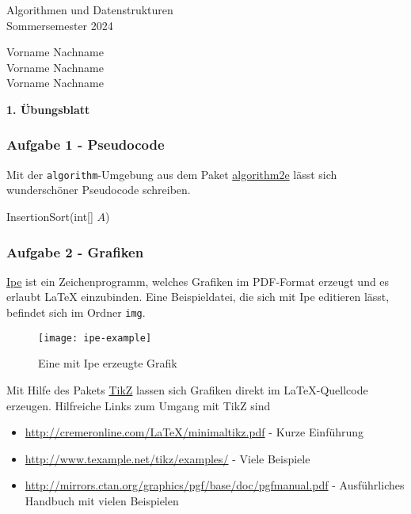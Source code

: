 \documentclass[11pt]{scrartcl}
\newcommand{\sheetNum}{1} %
\newcommand{\studentOne}{Vorname Nachname} %
\newcommand{\studentTwo}{Vorname Nachname} %
\newcommand{\studentThree}{Vorname Nachname} %
\newcommand{\task}[1]{\subsubsection*{#1}}
\newcommand{\subtask}[1]{\marginnote{#1)}}
\begin{document}
\begin{small}
\begin{minipage}{0.5 \linewidth}
  Algorithmen und Datenstrukturen\\
  Sommersemester 2024
\end{minipage}
\begin{minipage}{0.5\linewidth}
  \begin{flushright}
    \studentOne\\
    \studentTwo\\
    \studentThree
  \end{flushright}
\end{minipage}
\end{small}
\begin{center}
\begin{sffamily}\Large\bfseries \sheetNum. Übungsblatt\end{sffamily}
\end{center}


\task{Aufgabe 1 - Pseudocode}
Mit der \texttt{algorithm}-Umgebung aus dem Paket \href{https://www.ctan.org/pkg/algorithm2e}{algorithm2e} lässt sich wunderschöner Pseudocode schreiben.

\begin{algorithm}[H]
\caption{InsertionSort(int[] $A$)}
\end{algorithm}

\task{Aufgabe 2 - Grafiken}

\subtask{a} \href{http://ipe.otfried.org/}{Ipe} ist ein Zeichenprogramm, welches Grafiken im PDF-Format erzeugt und es erlaubt \LaTeX{} einzubinden. Eine Beispieldatei, die sich mit Ipe editieren lässt, befindet sich im Ordner \texttt{img}.
\begin{figure}[h]
\centering
\texttt{[image: ipe-example]}
\caption{Eine mit Ipe erzeugte Grafik}
\end{figure}

\subtask{b} Mit Hilfe des Pakets \href{https://www.ctan.org/pkg/pgf}{TikZ} lassen sich Grafiken direkt im \LaTeX-Quellcode erzeugen. Hilfreiche Links zum Umgang mit TikZ sind
\begin{itemize}
  \item \url{http://cremeronline.com/LaTeX/minimaltikz.pdf} - Kurze Einführung
  \item \url{http://www.texample.net/tikz/examples/} - Viele Beispiele
  \item \url{http://mirrors.ctan.org/graphics/pgf/base/doc/pgfmanual.pdf} - Ausführliches Handbuch mit vielen Beispielen
\end{itemize}
\end{document}
